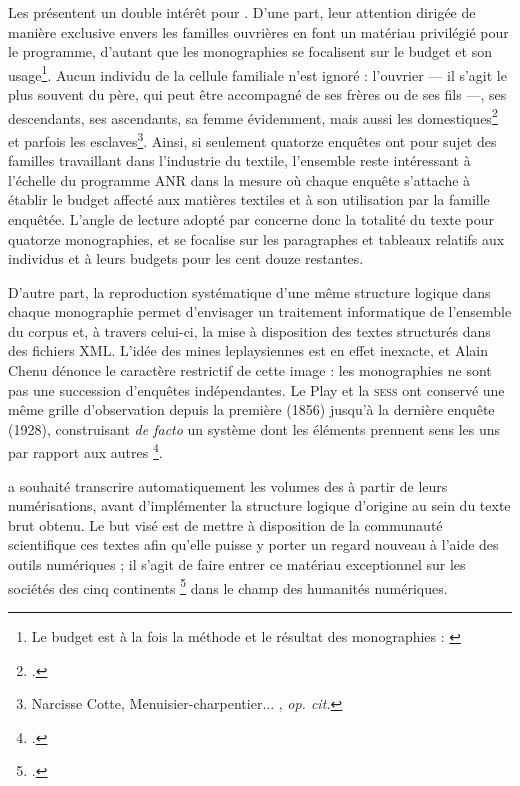 Les \odm{} présentent un double intérêt pour \timeus. D'une part, leur attention dirigée de manière exclusive envers les familles ouvrières en font un matériau privilégié pour le programme, d'autant que les monographies se focalisent sur le budget et son usage\footnote{Le budget est \og à la fois la méthode et le résultat \fg{} des monographies : \cite[p. 11]{cardoni}}. Aucun individu de la cellule familiale n'est ignoré : l'ouvrier --- il s'agit le plus souvent du père, qui peut être accompagné de ses frères ou de ses fils ---, ses descendants, ses ascendants, sa femme évidemment, mais aussi les domestiques\footcite{mono018a} et parfois les esclaves\footnote{Narcisse Cotte, \og Menuisier-charpentier... \fg{}, \textit{op. cit.}}. Ainsi, si seulement quatorze enquêtes ont pour sujet des familles travaillant dans l'industrie du textile, l'ensemble reste intéressant à l'échelle du programme ANR dans la mesure où chaque enquête s'attache à établir le budget affecté aux matières textiles et à son utilisation par la famille enquêtée. L'angle de lecture adopté par \timeus{} concerne donc la totalité du texte pour quatorze monographies, et se focalise sur les paragraphes et tableaux relatifs aux individus et à leurs budgets pour les cent douze restantes.

D'autre part, la reproduction systématique d'une même structure logique dans chaque monographie permet d'envisager un traitement informatique de l'ensemble du corpus et, à travers celui-ci, la mise à disposition des textes structurés dans des fichiers XML. L'idée des \og mines \fg{} leplaysiennes est en effet inexacte, et Alain Chenu dénonce le caractère restrictif de cette image : les monographies ne sont pas une succession d'enquêtes indépendantes. Le Play et la \textsc{sess} ont conservé une même \og grille d'observation \fg{} depuis la première (1856) jusqu'à la dernière enquête (1928), construisant \textit{de facto} un \og système dont les éléments prennent sens les uns par rapport aux autres \fg{}\footcite[p. 5]{chenu}.

\timeus{} a souhaité transcrire automatiquement les volumes des \odm{} à partir de leurs numérisations, avant d'implémenter la structure logique d'origine au sein du texte brut obtenu. Le but visé est de mettre à disposition de la communauté scientifique ces textes afin qu'elle puisse y porter un regard nouveau à l'aide des outils numériques ; il s'agit de faire entrer ce \og matériau exceptionnel sur les sociétés des cinq continents \fg{}\footcite{savoye} dans le champ des humanités numériques.

